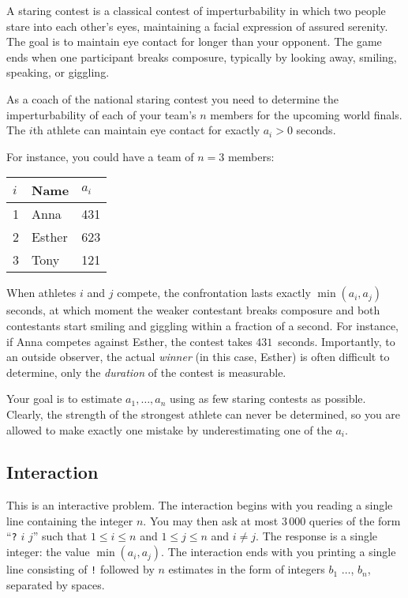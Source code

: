 

A staring contest is a classical contest of imperturbability in which two people stare into each other's eyes, maintaining a facial expression of assured serenity.
The goal is to maintain eye contact for longer than your opponent.
The game ends when one participant breaks composure, typically by looking away, smiling, speaking, or giggling.

As a coach of the national staring contest you need to determine the imperturbability of each of your team's $n$ members for the upcoming world finals.
The $i$th athlete can maintain eye contact for exactly $a_i > 0$ seconds.

For instance, you could have a team of $n=3$ members:

\medskip
\begin{tabular}{lll}
  $i$ & Name & $a_i$\\\hline
  1 & Anna &  431 \\
  2 & Esther & 623 \\
  3 & Tony &  121\\
\end{tabular}

\medskip
When athletes $i$ and $j$ compete, the confrontation lasts exactly $\min(a_i, a_j)$ seconds, at which moment the weaker contestant breaks composure and both contestants start smiling and giggling within a fraction of a second.
For instance, if Anna competes against Esther, the contest takes $431$~seconds.
Importantly, to an outside observer, the actual \emph{winner} (in this case, Esther) is often difficult to determine, only the \emph{duration} of the contest is measurable.

Your goal is to estimate $a_1,\ldots, a_n$ using as few staring contests as possible.
Clearly, the strength of the strongest athlete can never be determined, so you are allowed to make exactly one mistake by underestimating one of the $a_i$.

\subsection*{Interaction}

This is an interactive problem.
The interaction begins with you reading a single line containing the integer $n$.
You may then ask at most $3\,000$ queries of the form ``\texttt{?} $i$ $j$'' such that $1\leq i\leq n$ and $1\leq j\leq n$ and $i\neq j$.
The response is a single integer: the value $\min(a_i, a_j)$.
The interaction ends with you printing a single line consisting of \texttt{!} followed by $n$ estimates in the form of integers $b_1$ $\ldots$, $b_n$, separated by spaces.

